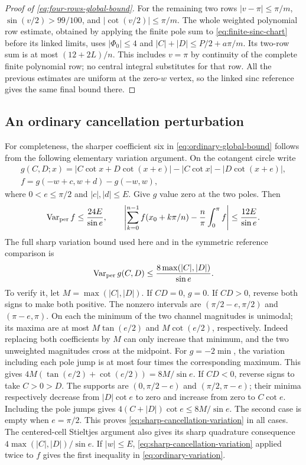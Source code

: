 \begin{proof}[Proof of \eqref{eq:four-rows-global-bound}]
For the remaining two rows $|v-\pi|\leq\pi/m$,
$\sin(v/2)>99/100$, and $|\cot(v/2)|\leq\pi/m$.
The whole weighted polynomial row estimate, obtained by applying the
finite pole sum to \eqref{eq:finite-sinc-chart} before its linked
limits, uses $|\Phi_0|\leq4$ and
$|C|+|D|\leq P/2+a\pi/m$. Its two-row sum is at most
$(12+2L)/n$. This includes $v=\pi$ by continuity of the complete
finite polynomial row; no central integral substitutes for that row.
All the previous estimates are uniform at the zero-$w$ vertex, so
the linked sinc reference gives the same final bound there.
\end{proof}

\subsection{An ordinary cancellation perturbation}

For completeness, the sharper coefficient six in
\eqref{eq:ordinary-global-bound} follows from the following elementary
variation argument. On the cotangent circle write
\begin{gather*}
 g(C,D;x)=|C\cot x+D\cot(x+e)|-|C\cot x|-|D\cot(x+e)|,\\
 f=g(-w+c,w+d)-g(-w,w),
\end{gather*}
where $0<e\leq\pi/2$ and $|c|,|d|\leq E$. Give $g$ value zero at
the two poles. Then
\begin{equation}\label{eq:ordinary-variation}
 \operatorname{Var}_{\rm per}f\leq\frac{24E}{\sin e},\qquad
 \left|\sum_{k=0}^{n-1}f(x_0+k\pi/n)-\frac n\pi\int_0^\pi f\right|
                  \leq\frac{12E}{\sin e}.
\end{equation}
The full sharp variation bound used here and in the symmetric reference
comparison is
\begin{equation}\label{eq:sharp-cancellation-variation}
 \operatorname{Var}_{\rm per}g(C,D)\leq
                \frac{8\max(|C|,|D|)}{\sin e}.
\end{equation}
To verify it, let $M=\max(|C|,|D|)$. If $CD=0$, $g=0$.
If $CD>0$, reverse both signs to make both positive. The nonzero
intervals are $(\pi/2-e,\pi/2)$ and $(\pi-e,\pi)$.
On each the minimum of the two channel magnitudes is unimodal;
its maxima are at most $M\tan(e/2)$ and $M\cot(e/2)$, respectively.
Indeed replacing both coefficients by $M$ can only increase that
minimum, and the two unweighted magnitudes cross at the midpoint.
For $g=-2\min$, the variation including each pole jump is at most
four times the corresponding maximum. This gives
$4M(\tan(e/2)+\cot(e/2))=8M/\sin e$.
If $CD<0$, reverse signs to take $C>0>D$.
The supports are $(0,\pi/2-e)$ and $(\pi/2,\pi-e)$;
their minima respectively decrease from $|D|\cot e$ to zero and
increase from zero to $C\cot e$. Including the pole jumps gives
$4(C+|D|)\cot e\leq8M/\sin e$.
The second case is empty when $e=\pi/2$.
This proves \eqref{eq:sharp-cancellation-variation} in all cases.
The centered-cell Stieltjes argument also gives its sharp quadrature
consequence $4\max(|C|,|D|)/\sin e$. If $|w|\leq E$,
\eqref{eq:sharp-cancellation-variation} applied twice to $f$ gives
the first inequality in \eqref{eq:ordinary-variation}.

